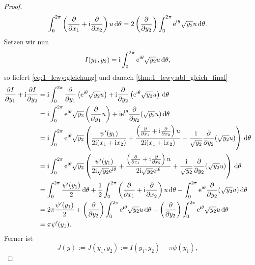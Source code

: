 \begin{proof}
\begin{align}
\begin{split}
\int_0^{2\pi} \left(\frac{\partial}{\partial x_1} +\mathrm i\frac{\partial}{\partial x_2}\right)u\,\mathrm d\theta 
= 2\left(\frac{\partial}{\partial y_2}\right)\int_0^{2\pi} \mathrm e^{\mathrm i\theta}\sqrt{y_2}u\,\mathrm d\theta.
\end{split}
\end{align}
Setzen wir nun 
\begin{equation}
I(y_1,y_2)=\mathrm i\int_0^{2\pi} \mathrm e^{\mathrm i\theta} \sqrt{y_2} u\,\mathrm d\theta,
\end{equation}
so liefert \eqref{eq:1_lewy:gleichung} und danach \eqref{thm:1_lewy:abl_gleich_final}
\begin{align}
\begin{split}
\frac{\partial I}{\partial y_1} +\mathrm i\frac{\partial I}{\partial y_2} 
&= \mathrm i\int_{0}^{2\pi} \frac{\partial}{\partial y_1}\left(\mathrm e^{\mathrm i\theta}\sqrt{y_2}u\right)+\mathrm i\frac{\partial}{\partial y_2}\left(\mathrm e^{\mathrm i\theta}\sqrt{y_2}u\right)\,\mathrm d\theta \\
&= \mathrm i\int_{0}^{2\pi} \mathrm e^{\mathrm i\theta}\sqrt{y_2}\left(\frac{\partial}{\partial y_1}u\right) +\mathrm i\mathrm e^{\mathrm i\theta}\frac{\partial}{\partial y_2}(\sqrt{y_2}u)\,\mathrm d\theta\\
&= \mathrm i\int_{0}^{2\pi} \mathrm e^{\mathrm i\theta}\sqrt{y_2} \left(
	\frac{\psi'(y_1)}{2\mathrm i(x_1+\mathrm i x_2)}
	+ \frac{\left(\frac{\partial}{\partial x_1} + \mathrm i\frac{\partial}{\partial x_2}\right)u}{2\mathrm i(x_1+\mathrm i x_2)} 
	+ \frac{\mathrm i}{\sqrt{y_2}} \frac{\partial}{\partial y_2}(\sqrt{y_2} u)
\right)\,\mathrm d\theta \\
&= \mathrm i\int_{0}^{2\pi} \mathrm e^{\mathrm i\theta}\sqrt{y_2} \left( 
	\frac{\psi'(y_1)}{2\mathrm i\sqrt{y_2}\mathrm e^{\mathrm i\theta}} 
	+ \frac{\left(\frac{\partial}{\partial x_1} + \mathrm i\frac{\partial}{\partial x_2}\right)u}{2\mathrm i\sqrt{y_2}\mathrm e^{\mathrm i\theta}}
	+ \frac{\mathrm i}{\sqrt{y_2}} \frac{\partial}{\partial y_2}(\sqrt{y_2} u)
\right)\,\mathrm d\theta	 \\
&= \int_0^{2\pi} \frac{\psi'(y_1)}{2}\,\mathrm d\theta 
	+ \frac{1}{2}\int_0^{2\pi} \left(\frac{\partial}{\partial x_1} +\mathrm i \frac{\partial}{\partial x_2}\right)u\,\mathrm d\theta
	- \int_0^{2\pi} \mathrm e^{\mathrm i\theta}\frac{\partial}{\partial y_2}(\sqrt{y_2} u) \,\mathrm d\theta \\
&= 2\pi\frac{\psi'(y_1)}{2}
	+  \left(\frac{\partial}{\partial y_2}\right)\int_0^{2\pi} \mathrm e^{\mathrm i\theta}\sqrt{y_2}u\,\mathrm d\theta
	- \left(\frac{\partial}{\partial y_2}\right) \int_0^{2\pi} \mathrm e^{\mathrm i\theta}\sqrt{y_2}u\,\mathrm d\theta\\
&= \pi\psi'(y_1).
\end{split}
\end{align}
Ferner ist
\begin{equation}
J(y):=J(y_1,y_2):=I(y_1,y_2)-\pi\psi(y_1),
\end{equation}

\end{proof}
